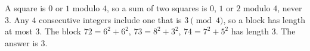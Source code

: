 A square is $0$ or $1$ modulo $4$, so a sum of two squares is $0$, $1$ or $2$ modulo $4$, never $3$. Any $4$ consecutive integers include one that is $3\pmod4$, so a block has length at most $3$. The block $72=6^2+6^2$, $73=8^2+3^2$, $74=7^2+5^2$ has length $3$. The answer is $\boxed{3}$.
